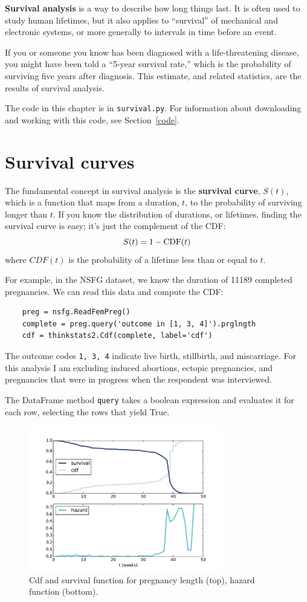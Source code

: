 \documentclass[12pt]{book}
\begin{document}
{\bf Survival analysis} is a way to describe how long things last.
It is often used to study human lifetimes, but it
also applies to ``survival'' of mechanical and electronic systems, or
more generally to intervals in time before an event.

If you or someone you know has been diagnosed with a life-threatening
disease, you might have been told a ``5-year survival rate,'' which
is the probability of surviving five years after diagnosis.  This
estimate, and related statistics, are the results of survival analysis.

The code in this chapter is in {\tt survival.py}.  For information
about downloading and working with this code, see Section~\ref{code}.


\section{Survival curves}

The fundamental concept in survival analysis is the {\bf survival
  curve}, $S(t)$, which is a function that maps from a duration, $t$, to the
probability of surviving longer than $t$.  If you know the distribution
of durations, or lifetimes, finding the survival curve is easy;
it's just the complement of the CDF:
%
\[ S(t) = 1 - \mathrm{CDF}(t) \]
%
where $CDF(t)$ is the probability of a lifetime less than or equal
to $t$.

For example, in the NSFG dataset, we know the duration of 11189
completed pregnancies.  We can read this data and compute the CDF:

\begin{verbatim}
    preg = nsfg.ReadFemPreg()
    complete = preg.query('outcome in [1, 3, 4]').prglngth
    cdf = thinkstats2.Cdf(complete, label='cdf')
\end{verbatim}

The outcome codes {\tt 1, 3, 4} indicate live birth, stillbirth,
and miscarriage.  For this analysis I am excluding induced abortions,
ectopic pregnancies, and pregnancies that were in progress when
the respondent was interviewed.

The DataFrame method {\tt query} takes a boolean expression and
evaluates it for each row, selecting the rows that yield True.

\begin{figure}
\centerline{\includegraphics[height=2.5in]{figs/survival1.pdf}}
\caption{Cdf and survival function for pregnancy length (top),
hazard function (bottom).}
\label{survival1}
\end{figure}
\end{document}
